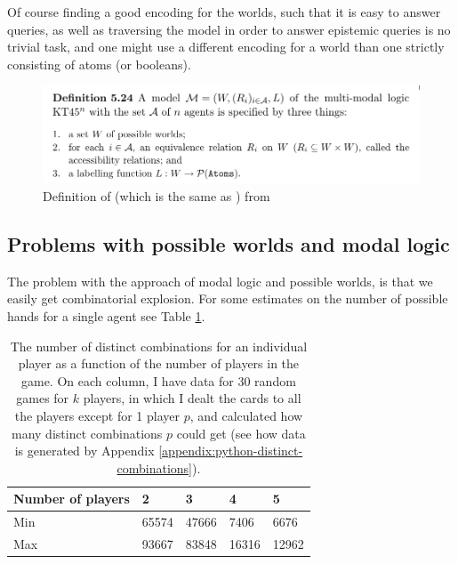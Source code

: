 Of course finding a good encoding for the worlds, such that it is easy to answer queries, as well as traversing the model in order to answer epistemic queries is no trivial task, and one might use a different encoding for a world than one strictly consisting of atoms (or booleans).






\begin{figure}
	\centering
\includegraphics[width=13cm,frame]{images/kt45n-definition.png}
	\caption{Definition of \KTfourfiveN (which is the same as \SfiveN{}) from \cite{HuthAndRyan2004KT45n}}
	\label{fig:kt45n-definition}
\end{figure}




\subsection{Problems with possible worlds and modal logic}
The problem with the approach of modal logic and possible worlds, is that we easily get combinatorial explosion. 
For some estimates on the number of possible hands for a single agent see Table \ref{table:combinations}.

\begin{table}
	\centering
\begin{tabular}{l|llll}
Number of players & 2       & 3       & 4       & 5      \\\hline
Min               & 65574   & 47666   & 7406    & 6676   \\
Max               & 93667   & 83848   & 16316   & 12962 
\end{tabular}
	\caption{The number of distinct combinations for an individual player as a function of the number of players in the game. 
	On each column, I have data for 30 random games for $k$ players, 
	in which I dealt the cards to all the players except for 1 player $p$, and calculated how many distinct combinations $p$ could get (see how data is generated by Appendix \ref{appendix:python-distinct-combinations}).}
	\label{table:combinations}
\end{table}


